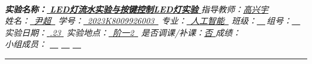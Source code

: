 \documentclass[UTF8]{article}
\theoremstyle{MyLineTheoremStyle} %
\theoremstyle{MyBlockTheoremStyle} %
\theoremstyle{MySubsubsectionStyle} %
\begin{document}


\begin{center}\large
    \\\vspace{0.4cm}
    \noindent\textit{
        \textbf{\bfseries 实验名称：}\uline{\hspace{0.8cm} \bfseries LED灯流水实验与按键控制LED灯实验 \hspace{0.8cm}}\hspace{0.4cm} 
        指导教师：\uline{\hspace{0.5cm}高兴宇\hspace{0.5cm}}}
    \\\vspace{0.1cm}
    \noindent\textit{
        姓名：\uline{\,\,\,尹超\,\,\,}\hspace{0.2cm}
        学号：\uline{\,\,\,{\upshape 2023K8009926003}\,\,\,}\hspace{0.2cm}
        专业：\uline{\,\,\,人工智能\,\,\,}\hspace{0.2cm}
        班级：\uline{\,\,\,\,\,\,}\,组号：\uline{\,\,\,\,\,\,}}
    \\\vspace{0.1cm}
    \noindent\textit{
        实验日期：\uline{\,\,{.23}\,\,}\hspace{0.2cm}
        实验地点：\uline{\,\,\,{\upshape 阶一2}\,\,\,}\hspace{0.2cm}
        是否调课/补课：\uline{\hspace{0.26cm}否 \hspace{0.26cm}}\hspace{0.2cm}
        成绩：\uline{\hspace{2cm}}}
    \\\vspace{0.1cm}
    \noindent\textit{
        小组成员：
        \uline{\,\,\,\,\,\,}\hspace{0.2cm}
        \uline{\,\,\,\,\,\,}\hspace{0.2cm}
        \uline{\,\,\,\,\,\,}\hspace{0.2cm}
    }
\end{center}
\noindent\rule{\textwidth}{0.1em}   %
\end{document}
